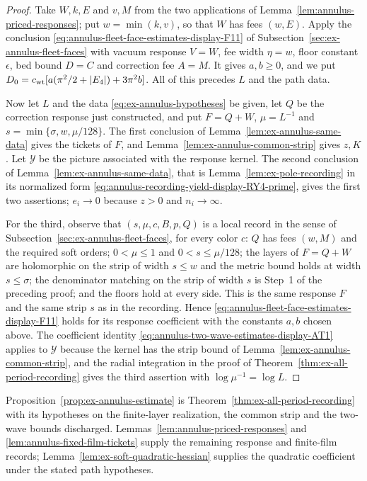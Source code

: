 \begin{proof}
Take $W,k,E$ and $v,M$ from the two applications of
Lemma~\ref{lem:annulus-priced-responses}; put $w=\min(k,v)$, so that
$W$ has fees $(w,E)$. Apply the conclusion \eqref{eq:annulus-fleet-face-estimates-display-F11} of
Subsection~\ref{sec:ex-annulus-fleet-faces} with vacuum response $V=W$,
fee width $\eta=w$, floor constant $\epsilon$, bed bound $D=C$ and
correction fee $A=M$. It gives $a,b\geq0$, and we put
$D_0=c_{\rm wt}[a(\pi^2/2+|E_4|)+3\pi^2b]$. All of this precedes $L$
and the path data.

Now let $L$ and the data \eqref{eq:ex-annulus-hypotheses} be given, let
$Q$ be the correction response just constructed, and put $F=Q+W$, $\mu=L^{-1}$ and
$s=\min\{\sigma,w,\mu/128\}$. The first conclusion of
Lemma~\ref{lem:ex-annulus-same-data} gives the tickets of $F$, and
Lemma~\ref{lem:ex-annulus-common-strip} gives $z,K$. Let $\mathcal Y$ be
the picture associated with the response kernel. The second conclusion
of Lemma~\ref{lem:ex-annulus-same-data}, that is
Lemma~\ref{lem:ex-pole-recording} in its normalized form
\eqref{eq:annulus-recording-yield-display-RY4-prime}, gives the first two assertions; $e_i\to0$ because
$z>0$ and $n_i\to\infty$.

For the third, observe that $(s,\mu,c,B,p,Q)$ is a local record in the
sense of Subsection~\ref{sec:ex-annulus-fleet-faces}, for every color $c$:
$Q$ has fees $(w,M)$ and the required soft orders; $0<\mu\leq1$ and
$0<s\leq\mu/128$; the layers of $F=Q+W$ are holomorphic on the strip of
width $s\leq w$ and the metric bound holds at width $s\leq\sigma$; the
denominator matching on the strip of width $s$ is Step~1 of the
preceding proof; and the floors hold at every side. This is the same
response $F$ and the same strip $s$ as in the recording. Hence \eqref{eq:annulus-fleet-face-estimates-display-F11}
holds for its response coefficient with the constants $a,b$ chosen
above. The coefficient identity \eqref{eq:annulus-two-wave-estimates-display-AT1} applies to $\mathcal Y$ because
the kernel has the strip bound of
Lemma~\ref{lem:ex-annulus-common-strip}, and the radial integration in
the proof of Theorem~\ref{thm:ex-all-period-recording} gives the third
assertion with $\log\mu^{-1}=\log L$.
\end{proof}

Proposition~\ref{prop:ex-annulus-estimate} is
Theorem~\ref{thm:ex-all-period-recording} with its hypotheses on the
finite-layer realization, the common strip and the two-wave bounds
discharged. Lemmas~\ref{lem:annulus-priced-responses} and
\ref{lem:annulus-fixed-film-tickets} supply the remaining response
and finite-film records; Lemma~\ref{lem:ex-soft-quadratic-hessian}
supplies the quadratic coefficient under the stated path hypotheses.

